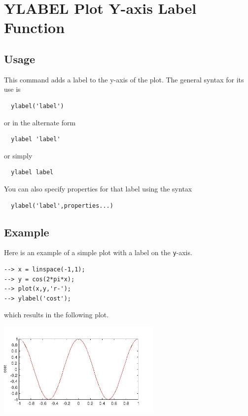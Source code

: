 \section{YLABEL Plot Y-axis Label Function}

\subsection{Usage}

This command adds a label to the y-axis of the plot.  The general syntax
for its use is
\begin{verbatim}
  ylabel('label')
\end{verbatim}
or in the alternate form
\begin{verbatim}
  ylabel 'label'
\end{verbatim}
or simply
\begin{verbatim}
  ylabel label
\end{verbatim}
You can also specify properties for that label using the syntax
\begin{verbatim}
  ylabel('label',properties...) 
\end{verbatim}
\subsection{Example}

Here is an example of a simple plot with a label on the \verb|y|-axis.
\begin{verbatim}
--> x = linspace(-1,1);
--> y = cos(2*pi*x);
--> plot(x,y,'r-');
--> ylabel('cost');
\end{verbatim}
which results in the following plot.


\centerline{\includegraphics[width=8cm]{ylabel1}}

